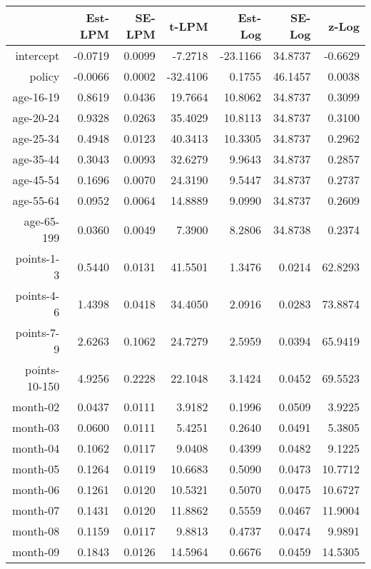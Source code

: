 \documentclass[10pt]{article}
\begin{document}
\begin{table}[ht]
\centering
\begin{tabular}{rrrrrrr}
  \hline
 & Est-LPM & SE-LPM & t-LPM & Est-Log & SE-Log & z-Log \\ 
  \hline
intercept & -0.0719 & 0.0099 & -7.2718 & -23.1166 & 34.8737 & -0.6629 \\ 
  policy & -0.0066 & 0.0002 & -32.4106 & 0.1755 & 46.1457 & 0.0038 \\ 
  age-16-19 & 0.8619 & 0.0436 & 19.7664 & 10.8062 & 34.8737 & 0.3099 \\ 
  age-20-24 & 0.9328 & 0.0263 & 35.4029 & 10.8113 & 34.8737 & 0.3100 \\ 
  age-25-34 & 0.4948 & 0.0123 & 40.3413 & 10.3305 & 34.8737 & 0.2962 \\ 
  age-35-44 & 0.3043 & 0.0093 & 32.6279 & 9.9643 & 34.8737 & 0.2857 \\ 
  age-45-54 & 0.1696 & 0.0070 & 24.3190 & 9.5447 & 34.8737 & 0.2737 \\ 
  age-55-64 & 0.0952 & 0.0064 & 14.8889 & 9.0990 & 34.8737 & 0.2609 \\ 
  age-65-199 & 0.0360 & 0.0049 & 7.3900 & 8.2806 & 34.8738 & 0.2374 \\ 
  points-1-3 & 0.5440 & 0.0131 & 41.5501 & 1.3476 & 0.0214 & 62.8293 \\ 
  points-4-6 & 1.4398 & 0.0418 & 34.4050 & 2.0916 & 0.0283 & 73.8874 \\ 
  points-7-9 & 2.6263 & 0.1062 & 24.7279 & 2.5959 & 0.0394 & 65.9419 \\ 
  points-10-150 & 4.9256 & 0.2228 & 22.1048 & 3.1424 & 0.0452 & 69.5523 \\ 
  month-02 & 0.0437 & 0.0111 & 3.9182 & 0.1996 & 0.0509 & 3.9225 \\ 
  month-03 & 0.0600 & 0.0111 & 5.4251 & 0.2640 & 0.0491 & 5.3805 \\ 
  month-04 & 0.1062 & 0.0117 & 9.0408 & 0.4399 & 0.0482 & 9.1225 \\ 
  month-05 & 0.1264 & 0.0119 & 10.6683 & 0.5090 & 0.0473 & 10.7712 \\ 
  month-06 & 0.1261 & 0.0120 & 10.5321 & 0.5070 & 0.0475 & 10.6727 \\ 
  month-07 & 0.1431 & 0.0120 & 11.8862 & 0.5559 & 0.0467 & 11.9004 \\ 
  month-08 & 0.1159 & 0.0117 & 9.8813 & 0.4737 & 0.0474 & 9.9891 \\ 
  month-09 & 0.1843 & 0.0126 & 14.5964 & 0.6676 & 0.0459 & 14.5305 \\ 

\end{tabular}
\end{table}
\end{document}
